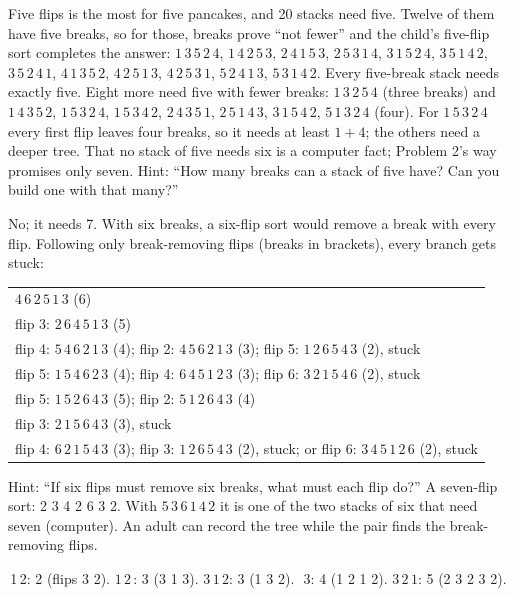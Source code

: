 Five flips is the most for five pancakes, and 20 stacks need five. Twelve of them have five breaks, so for those, breaks prove ``not fewer'' and the child's five-flip sort completes the answer: $1\,3\,5\,2\,4$, $1\,4\,2\,5\,3$, $2\,4\,1\,5\,3$, $2\,5\,3\,1\,4$, $3\,1\,5\,2\,4$, $3\,5\,1\,4\,2$, $3\,5\,2\,4\,1$, $4\,1\,3\,5\,2$, $4\,2\,5\,1\,3$, $4\,2\,5\,3\,1$, $5\,2\,4\,1\,3$, $5\,3\,1\,4\,2$. Every five-break stack needs exactly five. Eight more need five with fewer breaks: $1\,3\,2\,5\,4$ (three breaks) and $1\,4\,3\,5\,2$, $1\,5\,3\,2\,4$, $1\,5\,3\,4\,2$, $2\,4\,3\,5\,1$, $2\,5\,1\,4\,3$, $3\,1\,5\,4\,2$, $5\,1\,3\,2\,4$ (four). For $1\,5\,3\,2\,4$ every first flip leaves four breaks, so it needs at least $1+4$; the others need a deeper tree. That no stack of five needs six is a computer fact; Problem 2's way promises only seven. Hint: ``How many breaks can a stack of five have? Can you build one with that many?''

No; it needs 7. With six breaks, a six-flip sort would remove a break with every flip. Following only break-removing flips (breaks in brackets), every branch gets stuck:
\begin{center}\small\begin{tabular}{l}
$4\,6\,2\,5\,1\,3$ (6)\\
\quad flip 3: $2\,6\,4\,5\,1\,3$ (5)\\
\qquad flip 4: $5\,4\,6\,2\,1\,3$ (4); flip 2: $4\,5\,6\,2\,1\,3$ (3); flip 5: $1\,2\,6\,5\,4\,3$ (2), stuck\\
\qquad flip 5: $1\,5\,4\,6\,2\,3$ (4); flip 4: $6\,4\,5\,1\,2\,3$ (3); flip 6: $3\,2\,1\,5\,4\,6$ (2), stuck\\
\quad flip 5: $1\,5\,2\,6\,4\,3$ (5); flip 2: $5\,1\,2\,6\,4\,3$ (4)\\
\qquad flip 3: $2\,1\,5\,6\,4\,3$ (3), stuck\\
\qquad flip 4: $6\,2\,1\,5\,4\,3$ (3); flip 3: $1\,2\,6\,5\,4\,3$ (2), stuck; or flip 6: $3\,4\,5\,1\,2\,6$ (2), stuck
\end{tabular}\end{center}
Hint: ``If six flips must remove six breaks, what must each flip do?'' A seven-flip sort: 2 3 4 2 6 3 2. With $5\,3\,6\,1\,4\,2$ it is one of the two stacks of six that need seven (computer). An adult can record the tree while the pair finds the break-removing flips.

\,1\,2: 2 (flips 3 2). $1\,2$\,: 3 (3 1 3). $3\,1\,2$: 3 (1 3 2). \,\,$3$: 4 (1 2 1 2). $3\,2\,1$: 5 (2 3 2 3 2).

